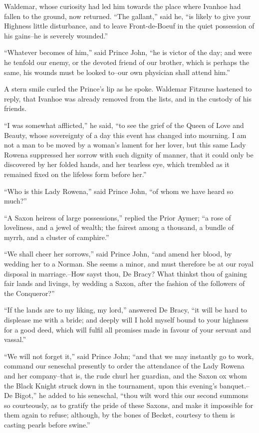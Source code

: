 Waldemar, whose curiosity had led him towards the place where Ivanhoe
had fallen to the ground, now returned. ``The gallant,'' said he, ``is
likely to give your Highness little disturbance, and to leave
Front-de-Boeuf in the quiet possession of his gains--he is severely
wounded.''

``Whatever becomes of him,'' said Prince John, ``he is victor of the
day; and were he tenfold our enemy, or the devoted friend of our
brother, which is perhaps the same, his wounds must be looked to--our
own physician shall attend him.''

A stern smile curled the Prince's lip as he spoke. Waldemar Fitzurse
hastened to reply, that Ivanhoe was already removed from the lists, and
in the custody of his friends.

``I was somewhat afflicted,'' he said, ``to see the grief of the Queen
of Love and Beauty, whose sovereignty of a day this event has changed
into mourning. I am not a man to be moved by a woman's lament for her
lover, but this same Lady Rowena suppressed her sorrow with such dignity
of manner, that it could only be discovered by her folded hands, and her
tearless eye, which trembled as it remained fixed on the lifeless form
before her.''

``Who is this Lady Rowena,'' said Prince John, ``of whom we have heard
so much?''

``A Saxon heiress of large possessions,'' replied the Prior Aymer; ``a
rose of loveliness, and a jewel of wealth; the fairest among a thousand,
a bundle of myrrh, and a cluster of camphire.''

``We shall cheer her sorrows,'' said Prince John, ``and amend her blood,
by wedding her to a Norman. She seems a minor, and must therefore be at
our royal disposal in marriage.--How sayst thou, De Bracy? What thinkst
thou of gaining fair lands and livings, by wedding a Saxon, after the
fashion of the followers of the Conqueror?''

``If the lands are to my liking, my lord,'' answered De Bracy, ``it will
be hard to displease me with a bride; and deeply will I hold myself
bound to your highness for a good deed, which will fulfil all promises
made in favour of your servant and vassal.''

``We will not forget it,'' said Prince John; ``and that we may instantly
go to work, command our seneschal presently to order the attendance of
the Lady Rowena and her company--that is, the rude churl her guardian,
and the Saxon ox whom the Black Knight struck down in the tournament,
upon this evening's banquet.--De Bigot,'' he added to his seneschal,
``thou wilt word this our second summons so courteously, as to gratify
the pride of these Saxons, and make it impossible for them again to
refuse; although, by the bones of Becket, courtesy to them is casting
pearls before swine.''

